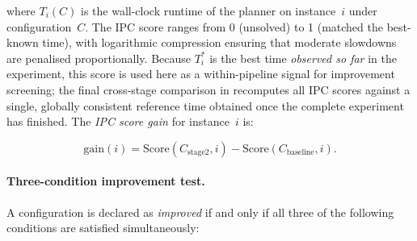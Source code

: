 \noindent where $T_i(C)$ is the wall-clock runtime of the planner on instance~$i$ under configuration~$C$.
The IPC score ranges from 0 (unsolved) to 1 (matched the best-known time), with logarithmic compression ensuring that moderate slowdowns are penalised proportionally.
Because $T^*_i$ is the best time \emph{observed so far} in the experiment, this score is used here as a within-pipeline signal for improvement screening; the final cross-stage comparison in  recomputes all IPC scores against a single, globally consistent reference time obtained once the complete experiment has finished.
The \emph{IPC score gain} for instance~$i$ is:

\begin{equation}\label{eq:ipc_gain}
  \text{gain}(i) = \text{Score}(C_{\text{stage2}}, i) - \text{Score}(C_{\text{baseline}}, i).
\end{equation}

\paragraph{Three-condition improvement test.}
A configuration is declared as \emph{improved} if and only if all three of the following conditions are satisfied simultaneously:

